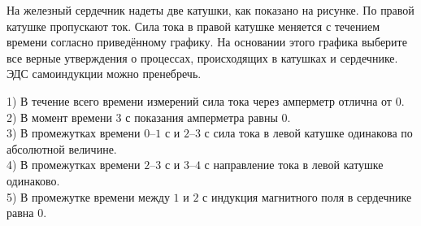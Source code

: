 
\begin{taskbasic}[code={\label{task:elem_ind_v1_n14}}]
На железный сердечник надеты две катушки, как показано на рисунке. По правой катушке пропускают ток. Сила тока в правой катушке меняется с течением времени согласно приведённому графику. На основании этого графика выберите все верные утверждения о процессах, происходящих в катушках и сердечнике. ЭДС самоиндукции можно пренебречь.

\nopagebreak\smallskip
\begin{center}

\end{center}

1) В течение всего времени измерений сила тока через амперметр отлична от 0.\\
2) В момент времени $3\text{ с}$ показания амперметра равны 0.\\
3) В промежутках времени $0\text{--}1\text{ с}$ и $2\text{--}3\text{ с}$ сила тока в левой катушке одинакова по абсолютной величине.\\
4) В промежутках времени $2\text{--}3\text{ с}$ и $3\text{--}4\text{ с}$ направление тока в левой катушке одинаково.\\
5) В промежутке времени между $1$ и $2\text{ с}$ индукция магнитного поля в сердечнике равна 0.

\end{taskbasic}

